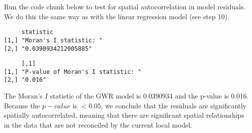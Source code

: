 \documentclass[
  12pt,
]{article}
\newenvironment{Shaded}{\begin{snugshade}}{\end{snugshade}}
\newcommand{\AttributeTok}[1]{\textcolor[rgb]{0.13,0.29,0.53}{#1}}
\newcommand{\CommentTok}[1]{\textcolor[rgb]{0.56,0.35,0.01}{\textit{#1}}}
\newcommand{\ConstantTok}[1]{\textcolor[rgb]{0.56,0.35,0.01}{#1}}
\newcommand{\DecValTok}[1]{\textcolor[rgb]{0.00,0.00,0.81}{#1}}
\newcommand{\FunctionTok}[1]{\textcolor[rgb]{0.13,0.29,0.53}{\textbf{#1}}}
\newcommand{\NormalTok}[1]{#1}
\newcommand{\OtherTok}[1]{\textcolor[rgb]{0.56,0.35,0.01}{#1}}
\newcommand{\SpecialCharTok}[1]{\textcolor[rgb]{0.81,0.36,0.00}{\textbf{#1}}}
\newcommand{\StringTok}[1]{\textcolor[rgb]{0.31,0.60,0.02}{#1}}
\begin{document}
Run the code chunk below to test for spatial autocorrelation in model
residuals. We do this the same way as with the linear regression model
(see step 10).

\begin{Shaded}
\end{Shaded}

\begin{verbatim}
     statistic              
[1,] "Moran's I statistic: "
[2,] "0.0390934212005885"   
\end{verbatim}

\begin{Shaded}
\end{Shaded}

\begin{verbatim}
     [,1]                              
[1,] "P-value of Moran's I statistic: "
[2,] "0.016"                           
\end{verbatim}

The Moran's \(I\) statistic of the GWR model is 0.0390934 and the
p-value is 0.016. Because the \(p-value\) is \(<0.05\), we conclude that
the residuals are significantly spatially autocorrelated, meaning that
there are significant spatial relationships in the data that are not
reconciled by the current local model.
\end{document}
